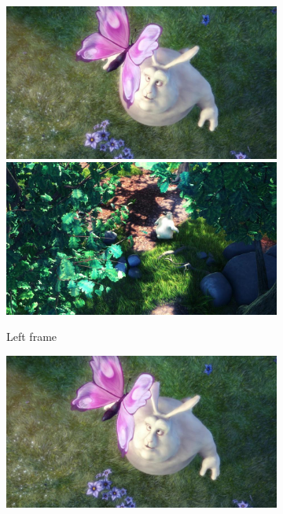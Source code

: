 \begin{figure}
	\centering
	\begin{subfigure}[t]{0.24\textwidth}
		\includegraphics[width=\textwidth]{figures/frames/left/frame-0076}\\
		\includegraphics[width=\textwidth]{figures/frames/left/frame-0391}
		\caption{Left frame}
	\end{subfigure}
	\begin{subfigure}[t]{0.24\textwidth}
		\includegraphics[width=\textwidth]{figures/frames/right/frame-0076}\\

\end{subfigure}
\end{figure}
